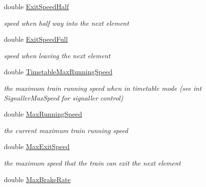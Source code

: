 \begin{DoxyCompactItemize}
double \mbox{\hyperlink{class_t_train_a05c926d79cbda85036d8d746131c3aef}{Exit\+Speed\+Half}}
\begin{DoxyCompactList}\small\item\em speed when half way into the next element \end{DoxyCompactList}\item 
\mbox{\label{class_t_train_ab3de27e27b474c1f2d224f73735fc1c2}} 
double \mbox{\hyperlink{class_t_train_ab3de27e27b474c1f2d224f73735fc1c2}{Exit\+Speed\+Full}}
\begin{DoxyCompactList}\small\item\em speed when leaving the next element \end{DoxyCompactList}\item 
\mbox{\label{class_t_train_adc5921a57f31d66e9b22f040717716d4}} 
double \mbox{\hyperlink{class_t_train_adc5921a57f31d66e9b22f040717716d4}{Timetable\+Max\+Running\+Speed}}
\begin{DoxyCompactList}\small\item\em the maximum train running speed when in timetable mode (see int Signaller\+Max\+Speed for signaller control) \end{DoxyCompactList}\item 
\mbox{\label{class_t_train_a0b9ba6ba25c153ba3142f63ec024ccde}} 
double \mbox{\hyperlink{class_t_train_a0b9ba6ba25c153ba3142f63ec024ccde}{Max\+Running\+Speed}}
\begin{DoxyCompactList}\small\item\em the current maximum train running speed \end{DoxyCompactList}\item 
\mbox{\label{class_t_train_ab0dc5c73f19ad8ef811f4464dfb5fc94}} 
double \mbox{\hyperlink{class_t_train_ab0dc5c73f19ad8ef811f4464dfb5fc94}{Max\+Exit\+Speed}}
\begin{DoxyCompactList}\small\item\em the maximum speed that the train can exit the next element \end{DoxyCompactList}\item 
\mbox{\label{class_t_train_a1cd5cd53f56a05bc4fde337e44bdd6d4}} 
double \mbox{\hyperlink{class_t_train_a1cd5cd53f56a05bc4fde337e44bdd6d4}{Max\+Brake\+Rate}}

\end{DoxyCompactItemize}
